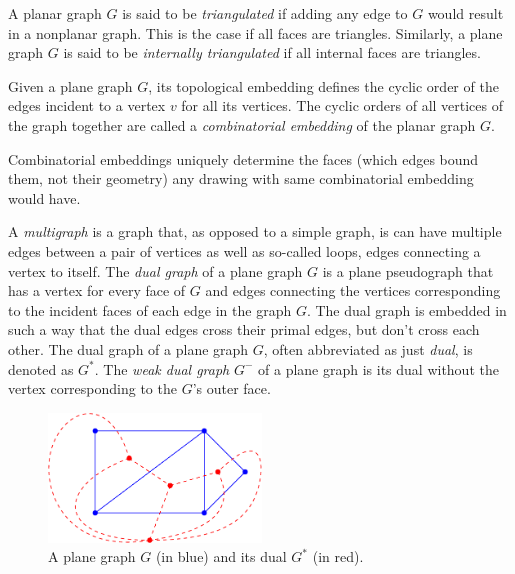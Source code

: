 \begin{definition}
	A planar graph $G$ is said to be \emph{triangulated} if adding any edge to $G$ would result in a nonplanar graph. This is the case if all faces are triangles.
	Similarly, a plane graph $G$ is said to be \emph{internally triangulated} if all internal faces are triangles.
\end{definition}

\begin{definition}
	Given a plane graph $G$, its topological embedding defines the cyclic order of the edges incident to a vertex $v$ for all its vertices. The cyclic orders of all vertices of the graph together are called a \emph{combinatorial embedding} of the planar graph $G$.
\end{definition}

Combinatorial embeddings uniquely determine the faces (which edges bound them, not their geometry) any drawing with same combinatorial embedding would have.

\begin{definition}
	A \emph{multigraph} is a graph that, as opposed to a simple graph, is can have multiple edges between a pair of vertices as well as so-called loops, \ie{} edges connecting a vertex to itself.
	The \emph{dual graph} of a plane graph $G$ is a plane pseudograph that has a vertex for every face of $G$ and edges connecting the vertices corresponding to the incident faces of each edge in the graph $G$. The dual graph is embedded in such a way that the dual edges cross their primal edges, but don't cross each other. The dual graph of a plane graph $G$, often abbreviated as just \emph{dual}, is denoted as $G^*$.
	The \emph{weak dual graph} $G^-$ of a plane graph is its dual without the vertex corresponding to the $G$'s outer face\cite{fleischner1974}.
\end{definition}

\begin{figure}[H]
	\centering\includegraphics[height=130px]{Resources/Preliminaries-Dual.pdf}
	\caption{A plane graph $G$ (in blue) and its dual $G^*$ (in red).}
	\label{fig:preliminaries-dual}
\end{figure}

